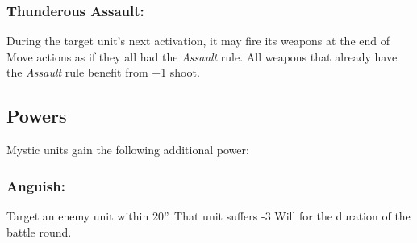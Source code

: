 \subsubsection*{Thunderous Assault:} During the target unit's next activation, it may fire its weapons at the end of Move actions as if they all had the \textit{Assault} rule. All weapons that already have the \textit{Assault} rule benefit from +1 shoot.



\subsection*{Powers}

Mystic units gain the following additional power:

\subsubsection*{Anguish:} Target an enemy unit within 20''. That unit suffers -3 Will for the duration of the battle round.


\pagebreak




